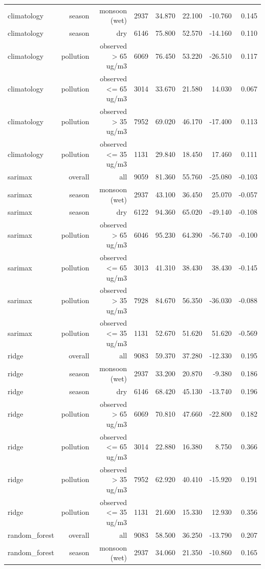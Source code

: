 \begin{table}[htbp]
\begin{tabular}{lrrrrrrr}
climatology & season & monsoon (wet) & 2937 & 34.870 & 22.100 & -10.760 & 0.145 \\
climatology & season & dry & 6146 & 75.800 & 52.570 & -14.160 & 0.110 \\
climatology & pollution & observed > 65 ug/m3 & 6069 & 76.450 & 53.220 & -26.510 & 0.117 \\
climatology & pollution & observed <= 65 ug/m3 & 3014 & 33.670 & 21.580 & 14.030 & 0.067 \\
climatology & pollution & observed > 35 ug/m3 & 7952 & 69.020 & 46.170 & -17.400 & 0.113 \\
climatology & pollution & observed <= 35 ug/m3 & 1131 & 29.840 & 18.450 & 17.460 & 0.111 \\
sarimax & overall & all & 9059 & 81.360 & 55.760 & -25.080 & -0.103 \\
sarimax & season & monsoon (wet) & 2937 & 43.100 & 36.450 & 25.070 & -0.057 \\
sarimax & season & dry & 6122 & 94.360 & 65.020 & -49.140 & -0.108 \\
sarimax & pollution & observed > 65 ug/m3 & 6046 & 95.230 & 64.390 & -56.740 & -0.100 \\
sarimax & pollution & observed <= 65 ug/m3 & 3013 & 41.310 & 38.430 & 38.430 & -0.145 \\
sarimax & pollution & observed > 35 ug/m3 & 7928 & 84.670 & 56.350 & -36.030 & -0.088 \\
sarimax & pollution & observed <= 35 ug/m3 & 1131 & 52.670 & 51.620 & 51.620 & -0.569 \\
ridge & overall & all & 9083 & 59.370 & 37.280 & -12.330 & 0.195 \\
ridge & season & monsoon (wet) & 2937 & 33.200 & 20.870 & -9.380 & 0.186 \\
ridge & season & dry & 6146 & 68.420 & 45.130 & -13.740 & 0.196 \\
ridge & pollution & observed > 65 ug/m3 & 6069 & 70.810 & 47.660 & -22.800 & 0.182 \\
ridge & pollution & observed <= 65 ug/m3 & 3014 & 22.880 & 16.380 & 8.750 & 0.366 \\
ridge & pollution & observed > 35 ug/m3 & 7952 & 62.920 & 40.410 & -15.920 & 0.191 \\
ridge & pollution & observed <= 35 ug/m3 & 1131 & 21.600 & 15.330 & 12.930 & 0.356 \\
random\_forest & overall & all & 9083 & 58.500 & 36.250 & -13.790 & 0.207 \\
random\_forest & season & monsoon (wet) & 2937 & 34.060 & 21.350 & -10.860 & 0.165 \\

\end{tabular}
\end{table}
